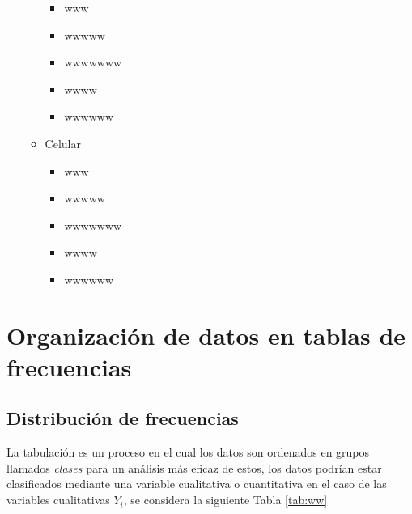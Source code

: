 \documentclass[10pt,]{krantz}
\providecommand{\tightlist}{%
  \setlength{\itemsep}{0pt}\setlength{\parskip}{0pt}}
\theoremstyle{definition}
\theoremstyle{definition}
\theoremstyle{definition}
\theoremstyle{definition}
\theoremstyle{remark}
\begin{document}
\begin{enumerate}
\begin{itemize}
    \begin{itemize}
    \tightlist
    \item
      www
    \item
      wwwww
    \item
      wwwwwww
    \item
      wwww
    \item
      wwwwww
    \end{itemize}
  \item
    Celular

    \begin{itemize}
    \tightlist
    \item
      www
    \item
      wwwww
    \item
      wwwwwww
    \item
      wwww
    \item
      wwwwww
    \end{itemize}
  \end{itemize}
\end{enumerate}

\hypertarget{organizaciuxf3n-de-datos-en-tablas-de-frecuencias}{%
\chapter{Organización de datos en tablas de frecuencias}\label{organizaciuxf3n-de-datos-en-tablas-de-frecuencias}}

\hypertarget{distribuciuxf3n-de-frecuencias}{%
\section{Distribución de frecuencias}\label{distribuciuxf3n-de-frecuencias}}

La tabulación es un proceso en el cual los datos son ordenados en grupos llamados \emph{clases} para un análisis más eficaz de estos, los datos podrían estar clasificados mediante una variable cualitativa o cuantitativa en el caso de las variables cualitativas \(Y_i\), se considera la siguiente Tabla \ref{tab:ww}
\end{document}
